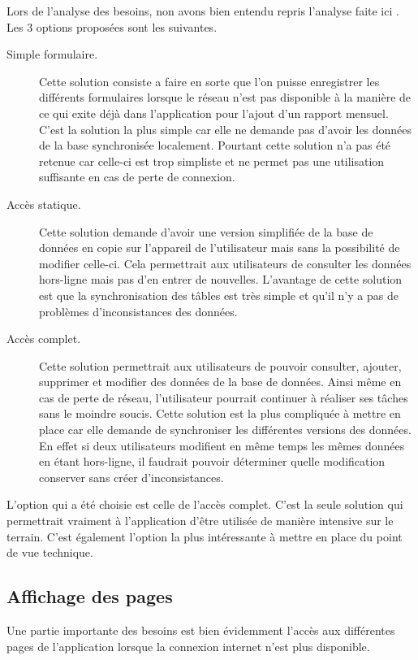 \documentclass{EPL-master-thesis-covers-FR}
\begin{document}
			Lors de l'analyse des besoins, non avons bien entendu repris l'analyse faite ici \cite{ref:haitiwater}. Les 3 options proposées sont les suivantes. 
			\begin{description}
				\item[Simple formulaire.] Cette solution consiste a faire en sorte que l'on puisse enregistrer les différents formulaires lorsque le réseau n'est pas disponible à la manière de ce qui exite déjà dans l'application pour l'ajout d'un rapport mensuel. C'est la solution la plus simple car elle ne demande pas d'avoir les données de la base synchronisée localement. Pourtant cette solution n'a pas été retenue car celle-ci est trop simpliste et ne permet pas une utilisation suffisante en cas de perte de connexion.
				\item[Accès statique.] Cette solution demande d'avoir une version simplifiée de la base de données en copie sur l'appareil de l'utilisateur mais sans la possibilité de modifier celle-ci. Cela permettrait aux utilisateurs de consulter les données hors-ligne mais pas d'en entrer de nouvelles. L'avantage de cette solution est que la synchronisation des tâbles est très simple et qu'il n'y a pas de problèmes d'inconsistances des données.
				\item[Accès complet.] Cette solution permettrait aux utilisateurs de pouvoir consulter, ajouter, supprimer et modifier des données de la base de données. Ainsi même en cas de perte de réseau, l'utilisateur pourrait continuer à réaliser ses tâches sans le moindre soucis. Cette solution est la plus compliquée à mettre en place car elle demande de synchroniser les différentes versions des données. En effet si deux utilisateurs modifient en même temps les mêmes données en étant hors-ligne, il faudrait pouvoir déterminer quelle modification conserver sans créer d'inconsistances.  
			\end{description}
			
			L'option qui a été choisie est celle de l'accès complet. C'est la seule solution qui permettrait vraiment à l'application d'être utilisée de manière intensive sur le terrain. C'est également l'option la plus intéressante à mettre en place du point de vue technique.
			
			
			\subsection*{Affichage des pages}
				Une partie importante des besoins est bien évidemment l'accès aux différentes pages de l'application lorsque la connexion internet n'est plus disponible. 
				
\end{document}
